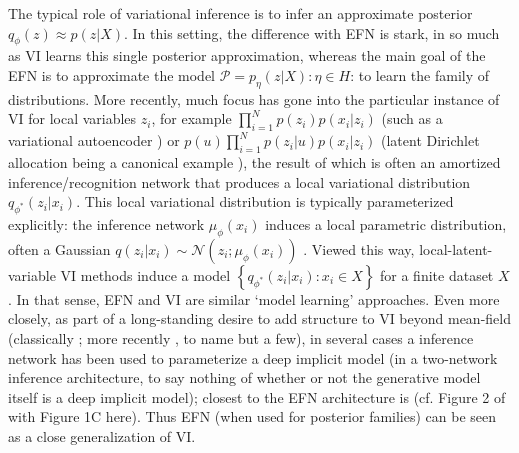 \documentclass[twoside]{article}
\begin{document}
The typical role of variational inference is to infer an approximate posterior $q_\phi(z) \approx p(z |X)$.  
In this setting, the difference with EFN is stark, in so much as VI learns this single posterior approximation, whereas the main goal of the EFN is to approximate the model $\mathcal{P} = p_\eta(z|X): \eta \in H$: to learn the family of distributions.  
More recently, much focus has gone into the particular instance of VI for local variables $z_i$, for example $\prod_{i=1}^N p(z_i)p(x_i | z_i)$ (such as a variational autoencoder \cite{Kingma:2013aa}) or  $p(u)\prod_{i=1}^N p(z_i|u)p(x_i | z_i)$ (latent Dirichlet allocation being a canonical example \cite{blei2003latent,blei2017variational}), the result of which is often an amortized inference/recognition network that produces a local variational distribution $q_{\phi^*}(z_i | x_i)$.  
This local variational distribution is typically parameterized explicitly: the inference network $\mu_\phi(x_i)$ induces a local parametric distribution, often a Gaussian $q(z_i | x_i) \sim \mathcal{N}\left(z_i; \mu_\phi(x_i)\right)$ \cite[for example]{Kingma:2013aa}.  Viewed this way, local-latent-variable VI methods induce a model $\left\{  q_{\phi^*}(z_i | x_i) : x_i \in X \right\}$ for a finite dataset $X$.   In that sense, EFN and VI are similar `model learning' approaches.
Even more closely, as part of a long-standing desire to add structure to VI beyond mean-field (classically \cite{saul1996exploiting, barber1999tractable}; more recently \cite{hoffman2015stochastic,tran2015copula}, to name but a few), in several cases a inference network has been used to parameterize a deep implicit model (in a two-network inference architecture, to say nothing of whether or not the generative model itself is a deep implicit model); closest to the EFN architecture is \cite{rezende2015variational} (cf. Figure 2 of \cite{rezende2015variational} with Figure 1C here).   Thus EFN (when used for posterior families) can be seen as a close generalization of VI.   
\end{document}
